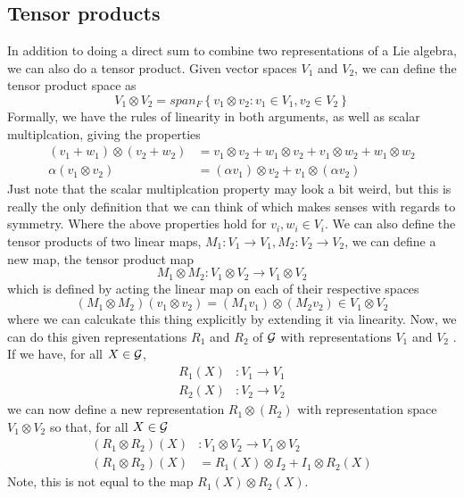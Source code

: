 \subsection{Tensor products} 
In addition to doing a direct sum to 
combine two representations of a Lie algebra, 
we can also do a tensor product. 
Given vector spaces $ V_1 $ and $ V_ 2 $, we can define the
tensor product space as 
\[
 V _ 1 \otimes V _ 2 =span_ F  \left\{ v _1 \otimes v _ 2 : v_1 \in V_1 , v_2 \in V_2  \right\} 
\] Formally, we have the rules of linearity in 
both arguments, as well as scalar multiplcation, giving the 
properties 
\begin{align*}
	( v_1 + w_1 ) \otimes ( v_2 + w_2 ) & = v_1 \otimes v_2 + w_ 1 \otimes v _ 2 + 
	v_1 \otimes w_2 + w_1 \otimes w_2 \\
	\alpha ( v_1 \otimes v_2 ) & = ( \alpha v_1 ) \otimes v_2 + v_1 \otimes ( \alpha v_2) 
\end{align*} Just note 
that the scalar multiplcation property may look a bit weird, 
but this is really the only definition that we can think
of which makes senses with regards to symmetry. 
Where the above properties hold for $ v_ i , w_ i \in V _ i $. 
We can also define 
the tensor products of two linear maps, 
$ M_1 : V_ 1 \to V _ 1  , M _ 2 : V _ 2 \to V _ 2 $, 
we can define a new map, the tensor product map 
\[
 M _ 1 \otimes M _2 : V _ 1 \otimes V _ 2 \to V _ 1 \otimes V _2
\] which is defined by acting the linear map 
on each of their respective spaces 
\[
 ( M _ 1 \otimes M _ 2 ) ( v_ 1 \otimes v _ 2 )  = ( M _ 1 v _ 1 ) \otimes ( M _ 2 v _ 2) \in 
 V _ 1 \otimes V  _ 2 
\] where we can calcukate this thing explicitly by extending it 
via linearity. 
Now, we can do this given representations $ R _ 1 $ and $ R  _ 2 $ of 
$ \mathcal{ G } $ with representations $ V  _1 $ and $ V  _ 2 $ . 
If we have, for all $ X \in \mathcal{ G }$, 
\begin{align*}
	R _ 1 ( X ) & : V_1 \to V_1 \\
	R_2 ( X) & : V _ 2 \to V _ 2 
\end{align*}
we can now define a new representation $ R _ 1 \otimes ( R_ 2) $ 
with representation space  $ V _ 1 \otimes V _ 2 $ so that, 
for all  $ X \in \mathcal{ G }$
 \begin{align*}
	 ( R_ 1 \otimes R _ 2 ) ( X) &: V _ 1 \otimes V _ 2 \to V _ 1 \otimes V _  2\\
	 ( R _ 1  \otimes R_ 2 ) ( X) &= R _ 1 ( X) \otimes I _ 2 + I _ 1 \otimes R_ 2 ( X) 
 \end{align*} Note, this is not equal to the map $ R _ 1 ( X) \otimes R _ 2 ( X) $. 
